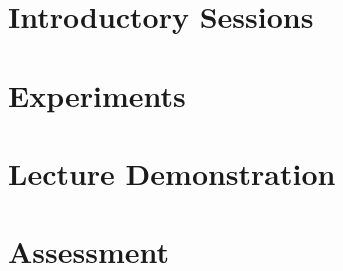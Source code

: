 \documentclass[a4paper,10pt]{article}
\begin{document}
\part{Introductory Sessions}



\clearpage

\part{Experiments}





\clearpage
{} 



\clearpage
{} 
 


\clearpage
{} 



\clearpage
{} 

\part{Lecture Demonstration}

\clearpage
{}



\clearpage
{}

\part{Assessment}



\clearpage
{} 
\end{document}
